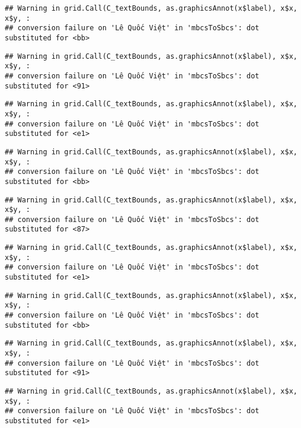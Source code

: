 \documentclass[
]{article}
\begin{document}
\begin{verbatim}
## Warning in grid.Call(C_textBounds, as.graphicsAnnot(x$label), x$x, x$y, :
## conversion failure on 'Lê Quốc Việt' in 'mbcsToSbcs': dot substituted for <bb>
\end{verbatim}

\begin{verbatim}
## Warning in grid.Call(C_textBounds, as.graphicsAnnot(x$label), x$x, x$y, :
## conversion failure on 'Lê Quốc Việt' in 'mbcsToSbcs': dot substituted for <91>
\end{verbatim}

\begin{verbatim}
## Warning in grid.Call(C_textBounds, as.graphicsAnnot(x$label), x$x, x$y, :
## conversion failure on 'Lê Quốc Việt' in 'mbcsToSbcs': dot substituted for <e1>
\end{verbatim}

\begin{verbatim}
## Warning in grid.Call(C_textBounds, as.graphicsAnnot(x$label), x$x, x$y, :
## conversion failure on 'Lê Quốc Việt' in 'mbcsToSbcs': dot substituted for <bb>
\end{verbatim}

\begin{verbatim}
## Warning in grid.Call(C_textBounds, as.graphicsAnnot(x$label), x$x, x$y, :
## conversion failure on 'Lê Quốc Việt' in 'mbcsToSbcs': dot substituted for <87>
\end{verbatim}

\begin{verbatim}
## Warning in grid.Call(C_textBounds, as.graphicsAnnot(x$label), x$x, x$y, :
## conversion failure on 'Lê Quốc Việt' in 'mbcsToSbcs': dot substituted for <e1>
\end{verbatim}

\begin{verbatim}
## Warning in grid.Call(C_textBounds, as.graphicsAnnot(x$label), x$x, x$y, :
## conversion failure on 'Lê Quốc Việt' in 'mbcsToSbcs': dot substituted for <bb>
\end{verbatim}

\begin{verbatim}
## Warning in grid.Call(C_textBounds, as.graphicsAnnot(x$label), x$x, x$y, :
## conversion failure on 'Lê Quốc Việt' in 'mbcsToSbcs': dot substituted for <91>
\end{verbatim}

\begin{verbatim}
## Warning in grid.Call(C_textBounds, as.graphicsAnnot(x$label), x$x, x$y, :
## conversion failure on 'Lê Quốc Việt' in 'mbcsToSbcs': dot substituted for <e1>
\end{verbatim}
\end{document}
